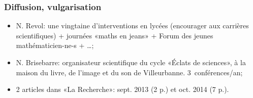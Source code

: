 \documentclass[mathsans]{beamer}
\begin{document}
\begin{frame}
\frametitle{Diffusion, vulgarisation}
\begin{itemize}
   \item N. Revol: une vingtaine d'interventions en lycées (encourager aux carrières scientifiques) + journées «maths en jeans» + Forum des jeunes mathématicien-ne-s + \ldots{};
   \item N. Brisebarre: organisateur scientifique du cycle «Éclats de sciences», à la maison du livre, de l'image et du son de Villeurbanne. 3~conférences/an;
 \end{itemize}
 \begin{minipage}{4cm}
 \begin{itemize}
   \item 2 articles dans «La Recherche»: sept. 2013 (2 p.) et oct. 2014 (7 p.).
 \end{itemize}
\end{minipage}
 \begin{minipage}{7cm}

\end{minipage}
\end{frame}
\end{document}
